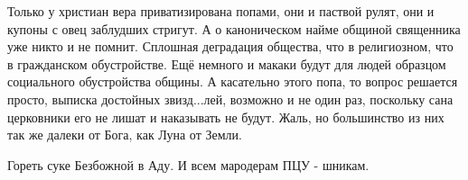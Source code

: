 \begin{itemize}

Только у христиан вера приватизирована попами, они и паствой рулят, они и
купоны с овец заблудших стригут. А о каноническом найме общиной священника уже
никто и не помнит. Сплошная деградация общества, что в религиозном, что в
гражданском обустройстве. Ещё немного и макаки будут для людей образцом
социального обустройства общины. А касательно этого попа, то вопрос решается
просто, выписка достойных звизд...лей, возможно и не один раз, поскольку сана
церковники его не лишат и наказывать не будут. Жаль, но большинство из них так
же далеки от Бога, как Луна от Земли.


Гореть суке Безбожной в Аду. И всем мародерам ПЦУ - шникам.

\end{itemize} %
